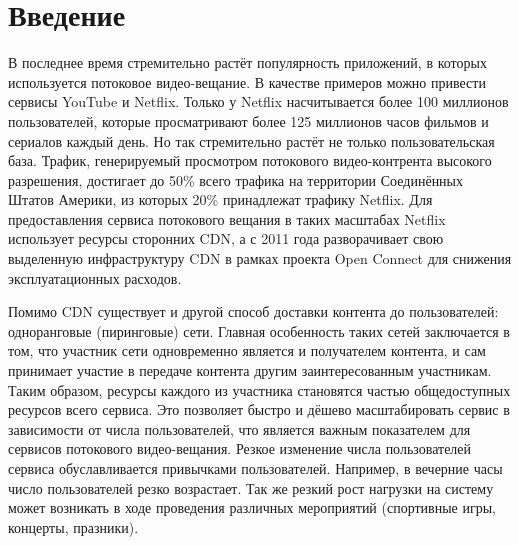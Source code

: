 

\tableofcontents
\newpage

\section{Введение}
	В последнее время стремительно растёт популярность приложений, в которых используется потоковое видео-вещание.
	В качестве примеров можно привести сервисы YouTube и Netflix. Только у Netflix насчитывается более 100 миллионов
	пользователей, которые просматривают более 125 миллионов часов фильмов и сериалов каждый день. Но так стремительно
	растёт не только пользовательская база. Трафик, генерируемый просмотром потокового видео-контрента высокого
	разрешения, достигает до 50\% всего трафика на территории Соединённых Штатов Америки, из которых 20\% принадлежат
	трафику Netflix. Для предоставления сервиса потокового вещания в таких масштабах Netflix использует ресурсы
	сторонних CDN, а с 2011 года разворачивает свою выделенную инфраструктуру CDN в рамках проекта Open Connect для
	снижения эксплуатационных расходов.

	Помимо CDN существует и другой способ доставки контента до пользователей: одноранговые (пиринговые) сети.
	Главная особенность таких сетей заключается в том, что участник сети одновременно является и получателем контента,
	и сам принимает участие в передаче контента другим заинтересованным участникам. Таким образом, ресурсы каждого из
	участника становятся частью общедоступных ресурсов всего сервиса. Это позволяет быстро и дёшево масштабировать
	сервис в зависимости от числа пользователей, что является важным показателем для сервисов потокового видео-вещания.
	Резкое изменение числа пользователей сервиса обуславливается привычками пользователей. Например, в вечерние часы
	число пользователей резко возрастает. Так же резкий рост нагрузки на систему может возникать в ходе проведения
	различных мероприятий (спортивные игры, концерты, празники).

